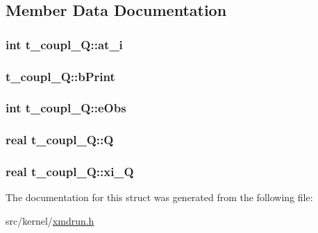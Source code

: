 \subsection{\-Member \-Data \-Documentation}
\hypertarget{structt__coupl__Q_aa4ea26bc64ba2a5e8ac539c7f03a65bc}{
\subsubsection[{at\-\_\-i}]{\setlength{\rightskip}{0pt plus 5cm}int {\bf t\-\_\-coupl\-\_\-\-Q\-::at\-\_\-i}}}\label{structt__coupl__Q_aa4ea26bc64ba2a5e8ac539c7f03a65bc}
\hypertarget{structt__coupl__Q_a46026c5d36ddcdb8a6fc237105c7abf7}{
\subsubsection[{b\-Print}]{ {\bf t\-\_\-coupl\-\_\-\-Q\-::b\-Print}}}\label{structt__coupl__Q_a46026c5d36ddcdb8a6fc237105c7abf7}
\hypertarget{structt__coupl__Q_ac7565c7acf8ff030537fa1162ddd913e}{
\subsubsection[{e\-Obs}]{\setlength{\rightskip}{0pt plus 5cm}int {\bf t\-\_\-coupl\-\_\-\-Q\-::e\-Obs}}}\label{structt__coupl__Q_ac7565c7acf8ff030537fa1162ddd913e}
\hypertarget{structt__coupl__Q_aa606d5de8591277ef87f8e4d28be918a}{
\subsubsection[{\-Q}]{\setlength{\rightskip}{0pt plus 5cm}real {\bf t\-\_\-coupl\-\_\-\-Q\-::\-Q}}}\label{structt__coupl__Q_aa606d5de8591277ef87f8e4d28be918a}
\hypertarget{structt__coupl__Q_ab2e34524a04200c939791d291b54957d}{
\subsubsection[{xi\-\_\-\-Q}]{\setlength{\rightskip}{0pt plus 5cm}real {\bf t\-\_\-coupl\-\_\-\-Q\-::xi\-\_\-\-Q}}}\label{structt__coupl__Q_ab2e34524a04200c939791d291b54957d}


\-The documentation for this struct was generated from the following file\-:\begin{DoxyCompactItemize}
\item 
src/kernel/\hyperlink{xmdrun_8h}{xmdrun.\-h}\end{DoxyCompactItemize}
